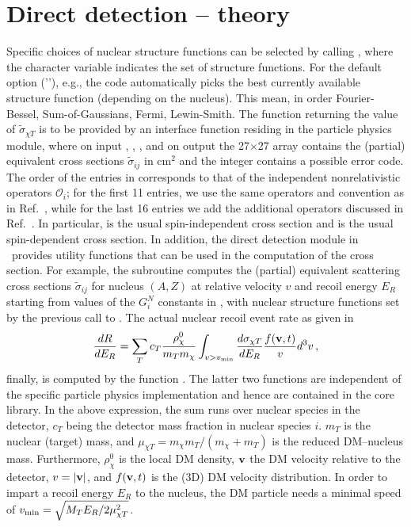 \section{Direct detection -- theory}

Specific choices of nuclear structure functions can be selected by calling  , where the 
character variable  indicates the set of structure functions. For the default option (''),
e.g., the code automatically picks the best currently available structure function (depending on the nucleus). 
This mean, in order Fourier-Bessel, Sum-of-Gaussians, Fermi, Lewin-Smith.
The function returning the value of $\tilde\sigma_{\chi T}$ is to be provided by an interface function 
 residing in the particle physics module, where on input , 
, 
,  and on output the 27$\times$27 array  contains the (partial) equivalent 
cross sections  $\tilde\sigma_{ij}$ in cm$^2$ and the integer  contains a possible error code. 
The order of the entries in  corresponds to that of the independent nonrelativistic operators 
$\mathcal{O}_i$; for the first 11 entries, we use the same operators and convention as in 
Ref.~\cite{Fitzpatrick:2012ix}, while for the last 16 entries  we add the additional operators discussed in 
Ref.~\cite{GondoloScopel}. In particular,  is the 
usual spin-independent cross section and  is the usual spin-dependent cross section.
In addition, the direct detection module in \ds\ provides utility functions that can be used in the computation of the 
cross section. For example, the subroutine   computes the (partial) 
equivalent  scattering cross sections $\tilde\sigma_{ij}$ for nucleus $(A,Z)$ at relative velocity $v$ and recoil energy 
$E_R$ starting from values of the $G_i^N$ constants in , with nuclear structure functions set by the 
previous call to . The actual nuclear recoil event rate as given in 
\begin{equation}
\frac{dR}{dE_R} = \sum_T c_T \frac{\rho_\chi^0}{m_T  m_\chi} \int_{v>v_{\rm min}} \frac{d\sigma_{\chi T}}{dE_R}  \frac{f({\bf v},t)}{v} d^3 v\,,
\label{eq:dRdE} 
\end{equation}
finally, is computed by the function .
The latter two functions are independent of the specific particle physics implementation and hence 
are contained in the core library.
In the above expression, the sum  runs over nuclear species in the detector, $c_T$ being the detector mass fraction in nuclear species 
$i$. $m_T$ is the nuclear (target) mass, and $\mu_{\chi T} = m_\chi m_T /(m_\chi + m_T)$ is the reduced DM--nucleus 
mass. 
Furthermore, $\rho_\chi^0$ is the local DM density, ${\bf v}$ the DM velocity relative to the detector, $v=|{\bf v}|$, and 
$f({\bf v},t)$ is the (3D) DM velocity distribution.  In order to impart a recoil energy $E_R$ to the nucleus, the DM
particle needs a minimal speed of $v_{\rm min}=\sqrt{M_TE_R/2\mu^2_{\chi T}}$. 

